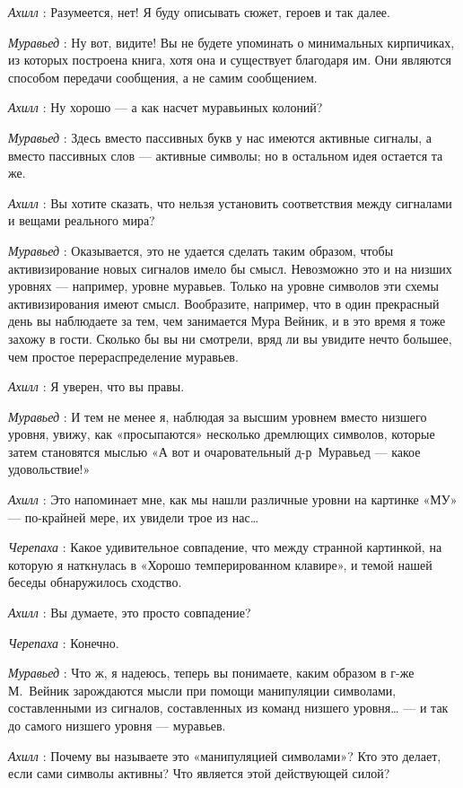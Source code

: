\documentclass[../main.tex]{subfiles}
\begin{document}
\begin{dialogue}
\emph{Ахилл} : Разумеется, нет! Я буду описывать сюжет, героев и так далее.

\emph{Муравьед} : Ну вот, видите! Вы не будете упоминать о минимальных кирпичиках, из которых построена книга, хотя она и существует благодаря им. Они являются способом передачи сообщения, а не самим сообщением.

\emph{Ахилл} : Ну хорошо --- а как насчет муравьиных колоний?

\emph{Муравьед} : Здесь вместо пассивных букв у нас имеются активные сигналы, а вместо пассивных слов --- активные символы; но в остальном идея остается та же.

\emph{Ахилл} : Вы хотите сказать, что нельзя установить соответствия между сигналами и вещами реального мира?

\emph{Муравьед} : Оказывается, это не удается сделать таким образом, чтобы активизирование новых сигналов имело бы смысл. Невозможно это и на низших уровнях --- например, уровне муравьев. Только на уровне символов эти схемы активизирования имеют смысл. Вообразите, например, что в один прекрасный день вы наблюдаете за тем, чем занимается Мура Вейник, и в это время я тоже захожу в гости. Сколько бы вы ни смотрели, вряд ли вы увидите нечто большее, чем простое перераспределение муравьев.

\emph{Ахилл} : Я уверен, что вы правы.

\emph{Муравьед} : И тем не менее я, наблюдая за высшим уровнем вместо низшего уровня, увижу, как «просыпаются» несколько дремлющих символов, которые затем становятся мыслью «А вот и очаровательный д-р~Муравьед --- какое удовольствие!»

\emph{Ахилл} : Это напоминает мне, как мы нашли различные уровни на картинке «МУ» --- по-крайней мере, их увидели трое из нас\ldots{}

\emph{Черепаха} : Какое удивительное совпадение, что между странной картинкой, на которую я наткнулась в «Хорошо темперированном клавире», и темой нашей беседы обнаружилось сходство.

\emph{Ахилл} : Вы думаете, это просто совпадение?

\emph{Черепаха} : Конечно.

\emph{Муравьед} : Что ж, я надеюсь, теперь вы понимаете, каким образом в г-же М.~Вейник зарождаются мысли при помощи манипуляции символами, составленными из сигналов, составленных из команд низшего уровня\ldots{} --- и так до самого низшего уровня --- муравьев.

\emph{Ахилл} : Почему вы называете это «манипуляцией символами»? Кто это делает, если сами символы активны? Что является этой действующей силой?


\end{dialogue}
\end{document}
